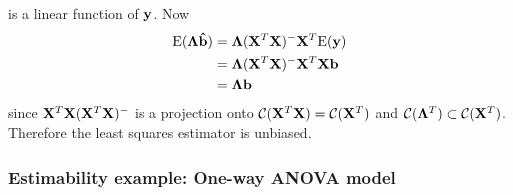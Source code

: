 \begin{itemize}
\begin{pf}
$$		$$
		is a linear function of $\mathbf{y}$.
		Now
		$$
		\begin{aligned}
			\mbox{E}(\mathbf{\Lambda \hat{b}}) &= \mathbf{\Lambda} (\mathbf{X}^T\mathbf{X})^-\mathbf{X}^T \mbox{E}(\mathbf{y}) \\
			&=\mathbf{\Lambda} (\mathbf{X}^T\mathbf{X})^-\mathbf{X}^T \mathbf{Xb} \\
			&= \mathbf{\Lambda b}\\
		\end{aligned}
		$$
		since $\mathbf{X}^T\mathbf{X}(\mathbf{X}^T\mathbf{X})^-$ is a projection onto $\mathcal{C}(\mathbf{X}^T\mathbf{X}) = \mathcal{C}(\mathbf{X}^T)$ and $\mathcal{C}(\mathbf{\Lambda}^T) \subset \mathcal{C}(\mathbf{X}^T)$.
		Therefore the least squares estimator is unbiased.
	\end{pf}
\end{itemize}

\subsubsection*{Estimability example: One-way ANOVA model}

